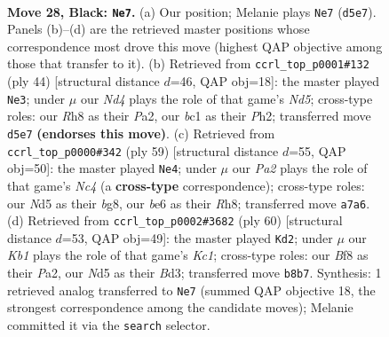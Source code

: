 \documentclass[11pt]{article}
\begin{document}
\clearpage

\begin{figure}[p]\centering
\begin{subfigure}{0.46\textwidth}\centering
\resizebox{\linewidth}{!}{%
\newchessgame
\chessboard[
  setfen={rk3b1r/p7/4B3/2PnpP1p/1P5R/8/8/R1B1K3 b Q - 6 28},
  showmover=false,
  pgfstyle=straightmove, color=movearrow, markmove={d5-e7}
]}
\caption{}
\end{subfigure}\hfill
\begin{subfigure}{0.46\textwidth}\centering
\resizebox{\linewidth}{!}{%
\newchessgame
\chessboard[
  setfen={5b2/p2k1p2/1pr2p2/3N3r/3P4/8/PP3P1P/3R1K1R w - - 0 23},
  showmover=false,
  pgfstyle=straightmove, color=movearrow, markmove={d5-e3}
]}
\caption{}
\end{subfigure}
\\[4pt]
\begin{subfigure}{0.46\textwidth}\centering
\resizebox{\linewidth}{!}{%
\newchessgame
\chessboard[
  setfen={6Br/6Rp/3p2p1/p1n3k1/7r/7P/P1P3P1/2K2R2 b - - 0 30},
  showmover=false,
  pgfstyle=straightmove, color=movearrow, markmove={c5-e4}
]}
\caption{}
\end{subfigure}\hfill
\begin{subfigure}{0.46\textwidth}\centering
\resizebox{\linewidth}{!}{%
\newchessgame
\chessboard[
  setfen={5k2/1p6/p1r1b2R/3p4/8/3B1r2/PPP5/2KR4 w - - 0 31},
  showmover=false,
  pgfstyle=straightmove, color=movearrow, markmove={c1-d2}
]}
\caption{}
\end{subfigure}
\caption{\textbf{Move 28, Black: \texttt{Ne7}.} (a) Our position; Melanie plays \texttt{Ne7} (\texttt{d5e7}). Panels (b)--(d) are the retrieved master positions whose correspondence most drove this move (highest QAP objective among those that transfer to it). (b) Retrieved from \texttt{ccrl\_top\_p0001\#132} (ply 44) [structural distance $d$=46, QAP obj=18]: the master played \texttt{Ne3}; under $\mu$ our \emph{Nd4} plays the role of that game's \emph{Nd5}; cross-type roles: our \emph{R}h8 as their \emph{P}a2, our \emph{b}c1 as their \emph{P}h2; transferred move \texttt{d5e7} \textbf{(endorses this move)}. (c) Retrieved from \texttt{ccrl\_top\_p0000\#342} (ply 59) [structural distance $d$=55, QAP obj=50]: the master played \texttt{Ne4}; under $\mu$ our \emph{Pa2} plays the role of that game's \emph{Nc4} (a \textbf{cross-type} correspondence); cross-type roles: our \emph{N}d5 as their \emph{b}g8, our \emph{b}e6 as their \emph{R}h8; transferred move \texttt{a7a6}. (d) Retrieved from \texttt{ccrl\_top\_p0002\#3682} (ply 60) [structural distance $d$=53, QAP obj=49]: the master played \texttt{Kd2}; under $\mu$ our \emph{Kb1} plays the role of that game's \emph{Kc1}; cross-type roles: our \emph{B}f8 as their \emph{P}a2, our \emph{N}d5 as their \emph{B}d3; transferred move \texttt{b8b7}. Synthesis: 1 retrieved analog transferred to \texttt{Ne7} (summed QAP objective 18, the strongest correspondence among the candidate moves); Melanie committed it via the \texttt{search} selector.}
\label{fig:thought-m55}
\end{figure}
\end{document}
